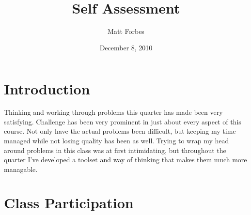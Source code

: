 \documentclass[a4paper,12pt]{article}
\begin{document}
\title{Self Assessment}
\author{Matt Forbes}
\date{December 8, 2010}
\maketitle

\section*{Introduction}

Thinking and working through problems this quarter has made been very
satisfying. Challenge has been very prominent in just about every
aspect of this course. Not only have the actual problems been
difficult, but keeping my time managed while not losing quality has
been as well. Trying to wrap my head around problems in this class was
at first intimidating, but throughout the quarter I've developed a
toolset and way of thinking that makes them much more managable.

\section*{Class Participation}
\end{document}
